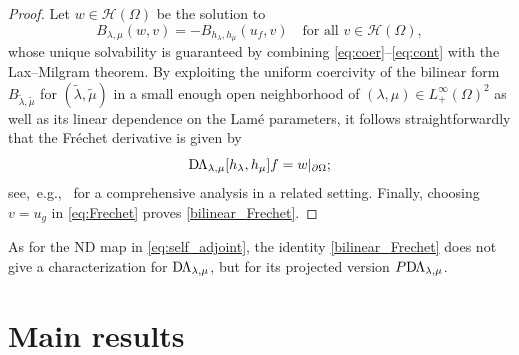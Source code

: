 \documentclass[reqno]{amsart}
\numberwithin{equation}{section}
\numberwithin{figure}{section}
\numberwithin{table}{section}
\newcommand{\DLambda}{\textup{D}\mkern-1.5mu \Lambda}
\theoremstyle{definition}
\theoremstyle{plain}
\theoremstyle{definition}
\theoremstyle{remark}
\numberwithin{equation}{section}
\begin{document}
\begin{proof}
	Let $w \in \mathcal{H}(\Omega)$ be the solution to
	\begin{equation} \label{eq:Frechet}
		B_{\lambda, \mu}(w, v) = -B_{h_\lambda, h_\mu}(u_f,v) \quad \text{for all } v \in \mathcal{H}(\Omega),
	\end{equation}
	whose unique solvability is guaranteed by combining \eqref{eq:coer}--\eqref{eq:cont} with the Lax--Milgram theorem. By exploiting the uniform coercivity of the bilinear form $B_{\widetilde{\lambda}, \widetilde{\mu}}$ for $(\widetilde{\lambda}, \widetilde{\mu})$ in a small enough open neighborhood of $(\lambda, \mu) \in L^\infty_+(\Omega)^2$ as well as its linear dependence on the Lam\'e parameters, it follows straightforwardly that the Fr\'echet derivative is given by 
	\begin{equation*}
		\DLambda_{\lambda,\mu}[h_\lambda,h_\mu] f = w|_{\partial \Omega};
	\end{equation*}
	see,~e.g.,~\cite{Garde22} for a comprehensive analysis in a related setting. Finally, choosing $v = u_g$ in \eqref{eq:Frechet} proves \eqref{bilinear_Frechet}.
\end{proof}

As for the ND map in \eqref{eq:self_adjoint}, the identity \eqref{bilinear_Frechet} does not give a characterization for $\DLambda_{\lambda,\mu}$, but for its projected version $P \DLambda_{\lambda,\mu}$.

\section{Main results} \label{sec:main}
\end{document}
